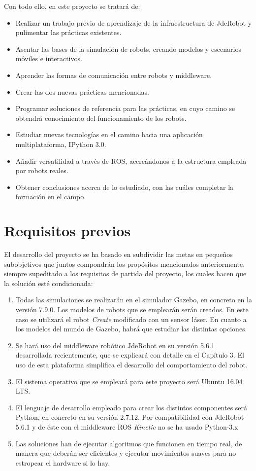 Con todo ello, en este proyecto se tratará de:
\vspace{0.5cm}

\begin{itemize}%
  \renewcommand{\labelitemi}{$\to$}
 \item Realizar un trabajo previo de aprendizaje de la infraestructura de JdeRobot y pulimentar las prácticas existentes.
  \item Asentar las bases de la simulación de robots, creando modelos y escenarios móviles e interactivos.
  \item Aprender las formas de comunicación entre robots y middleware.
  \item Crear las dos nuevas prácticas mencionadas.
  \item Programar soluciones de referencia para las prácticas, en cuyo camino se obtendrá conocimiento del funcionamiento de los robots.
	\item Estudiar nuevas tecnologías en el camino hacia una aplicación multiplataforma, IPython 3.0.
	\item Añadir versatilidad a través de ROS, acercándonos a la estructura empleada por robots reales.
	\item Obtener conclusiones acerca de lo estudiado, con las cuáles completar la formación en el campo.
\end{itemize}

\section{Requisitos previos} 
El desarrollo del proyecto se ha basado en subdividir las metas en pequeños subobjetivos que juntos compondrán los propósitos mencionados anteriormente, siempre supeditado a los requisitos de partida del proyecto, los cuales hacen que la solución esté condicionada:

\begin{enumerate}
	\item Todas las simulaciones se realizarán en el simulador Gazebo, en concreto en la versión 7.9.0. Los modelos de robots que se emplearán serán creados. En este caso se utilizará el robot \textit{Create} modificado con un sensor láser. En cuanto a los modelos del mundo de Gazebo, habrá que estudiar las distintas opciones.
	\item Se hará uso del middleware robótico JdeRobot en su versión 5.6.1 desarrollada recientemente, que se explicará con detalle en el Capítulo 3. El uso de esta plataforma simplifica el desarrollo del comportamiento del robot.
	\item El sistema operativo que se empleará para este proyecto será Ubuntu 16.04 LTS.
	\item El lenguaje de desarrollo empleado para crear los distintos componentes será Python, en concreto en su versión 2.7.12. Por compatibilidad con JdeRobot-5.6.1 y de éste con el middleware ROS \textit{Kinetic} no se ha usado Python-3.x
	\item Las soluciones han de ejecutar algoritmos que funcionen en tiempo real, de manera que deberán ser eficientes y ejecutar movimientos suaves para no estropear el hardware si lo hay.
\end{enumerate}

